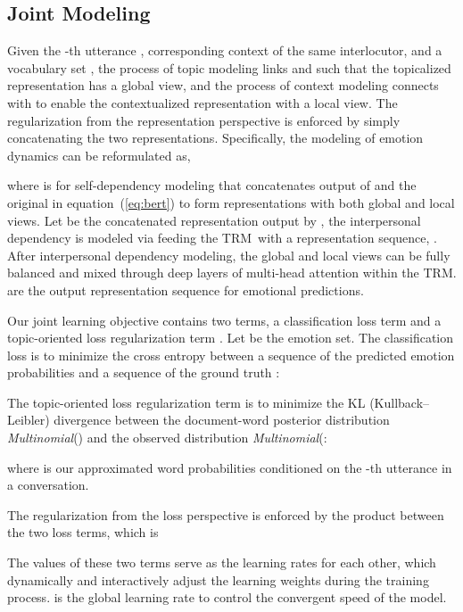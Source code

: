 \documentclass{ecai}
\def \TRM {\mbox{TRM}}
\begin{document}
\subsection{Joint Modeling}
Given the -th utterance , corresponding context  of the same interlocutor, and a vocabulary set , the process of topic modeling links  and  such that the topicalized representation has a global view, and the process of context modeling connects  with  to enable the contextualized representation with a local view. The regularization from the representation perspective is enforced by simply concatenating the two representations. Specifically, the modeling of emotion dynamics can be reformulated as,

where  is for self-dependency modeling that concatenates output of  and the original  in equation~(\ref{eq:bert}) to form representations with both global and local views. Let  be the concatenated representation output by , the interpersonal dependency is modeled via feeding the \TRM~with a representation sequence, . After interpersonal dependency modeling, the global and local views can be fully balanced and mixed through deep layers of multi-head attention within the \TRM.  are the output representation sequence for emotional predictions. 

Our joint learning objective contains two terms, a classification loss term  and a topic-oriented loss regularization term . Let  be the emotion set. The classification loss is to minimize the cross entropy between a sequence of the predicted emotion probabilities  and a sequence of the ground truth :

The topic-oriented loss regularization term is to minimize the KL (Kullback–Leibler) divergence between the document-word posterior distribution \textit{Multinomial}() and the observed distribution \textit{Multinomial}(:

where  is our approximated word probabilities conditioned on the -th utterance in a conversation. 

The regularization from the loss perspective is enforced by the product between the two loss terms, which is

The values of these two terms serve as the learning rates for each other, which dynamically and interactively adjust the learning weights during the training process.  is the global learning rate to control the convergent speed of the model.
\end{document}
